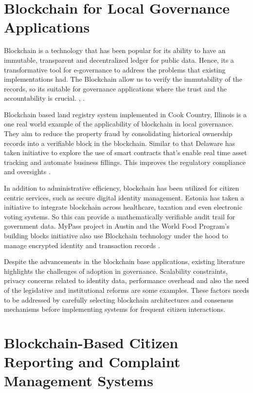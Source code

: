 \section{Blockchain for Local Governance Applications}

Blockchain is a technology that has been popular for its ability to have an immutable, transparent and decentralized ledger for public data. Hence, its a transformative tool for e-governance to address the problems that existing implementations had. The Blockchain allow us to verify the immutability of the records, so its suitable for governance applications where the trust and the accountability is crucial. \cite{hamill2018blockchain}, \cite{goswami2020egovernance}.

Blockchain based land registry system implemented in Cook Country, Illinois is a one real world example of the applicability of blockchain in local governance. They aim to reduce the property fraud by consolidating historical ownership records into a verifiable block in the blockchain. Similar to that Delaware has taken initiative to explore the use of smart contracts that's enable real time asset tracking and automate business fillings. This improves the regulatory compliance and oversights \cite{goswami2020egovernance}.

In addition to administrative efficiency, blockchain has been utilized for citizen centric services, such as secure digital identity management. Estonia has taken a initiative to integrate blockchain across healthcare, taxation and even electronic voting systems. So this can provide a mathematically verifiable audit trail for government data. MyPass project in Austin and the World Food Program's building blocks initiative also use Blockchain technology under the hood to manage encrypted identity and transaction records \cite{hamill2018blockchain}.

Despite the advancements in the blockchain base applications, existing literature highlights the challenges of adoption in governance. Scalability constraints, privacy concerns related to identity data, performance overhead and also the need of the legislative and institutional reforms are  some examples. These factors needs to be addressed by carefully selecting blockchain architectures and consensus mechanisms before implementing systems for frequent citizen interactions.

\section{Blockchain-Based Citizen Reporting and Complaint Management Systems}

